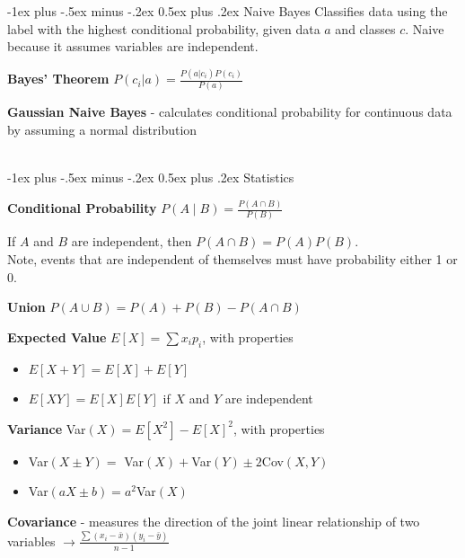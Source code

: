 \documentclass[10pt,landscape]{article}
\makeatletter
\renewcommand{\section}{\@startsection{section}{1}{0mm}%
                                {-1ex plus -.5ex minus -.2ex}%
                                {0.5ex plus .2ex}%
                                {\normalfont\large\bfseries}}
\makeatother
\begin{document}
\begin{multicols}{3}
\section{Naive Bayes}
Classifies data using the label with the highest conditional probability, given data $a$ and classes $c$. Naive because it assumes variables are independent.

\textbf{Bayes' Theorem} $ P({c_i}|{a})  = \frac{P({a}|{c_i})P({c_i})}{P({a})}$

\textbf{Gaussian Naive Bayes} - calculates conditional probability for continuous data by assuming a normal distribution

\columnbreak
\textcolor{white}{.}\vspace{-5mm}\\ %
\section{Statistics}

\textbf{Conditional Probability} $P(A \mid B) = \frac{P(A \cap B)}{P(B)}$

If $A$ and $B$ are independent, then $P(A \cap B) = P(A) P(B)$.\\
Note, events that are independent of themselves must have
probability either 1 or 0.

\textbf{Union} $P(A \cup B) = P(A) + P(B) - P(A \cap B) $

\textbf{Expected Value} $E[X] = \sum x_i p_i$, with properties
    \begin{itemize}[label={--},leftmargin=4mm]
    \itemsep -.4mm
    \item $E[X + Y] = E[X] + E[Y]$
    \item $E[XY] = E[X]E[Y]$ if $X$ and $Y$ are independent
    \end{itemize}

\textbf{Variance} Var$(X) = E[X^2] - E[X]^2$, with properties
    \begin{itemize}[label={--},leftmargin=4mm]
    \itemsep -.4mm
    \item Var$(X\pm Y) =$ Var$(X) +$Var$(Y) \pm 2$Cov$(X,Y)$
    \item Var$(aX \pm b) = a^2$Var$(X)$
    \end{itemize}

\textbf{Covariance} - measures the direction of the joint linear relationship of two variables
$\to \frac{\sum (x_i - \bar{x}) (y_i - \bar{y})}{n-1} $


\end{multicols}
\end{document}
